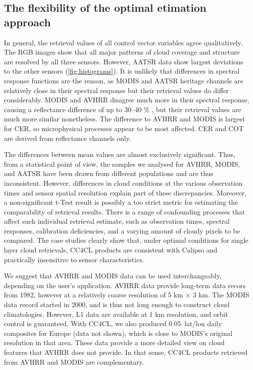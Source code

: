 \label{conclusions}

\subsection{The flexibility of the optimal etimation approach}


In general, the retrieval values of all control vector variables agree qualitatively. The RGB images show that all major patterns of cloud coverage and structure are resolved by all three sensors. However, AATSR data show largest deviations to the other sensors (\cref{fig:histograms}). It is unlikely that differences in spectral response functions are the reason, as MODIS and AATSR heritage channels are relatively close in their spectral response but their retrieval values do differ considerably. MODIS and AVHRR disagree much more in their spectral response, causing a reflectance difference of up to 30--40 \% \citep{Trishchenko02}, but their retrieval values are much more similar nonetheless. The difference to AVHRR and MODIS is largest for CER, so microphysical processes appear to be most affected. CER and COT are derived from reflectance channels only. 

The differences between mean values are almost exclusively significant. Thus, from a statistical point of view, the samples we analysed for AVHRR, MODIS, and AATSR have been drawn from different populations and are thus inconsistent. However, differences in cloud conditions at the various observation times and sensor spatial resolution explain part of these discrepancies. Moreover, a non-significant t-Test result is possibly a too strict metric for estimating the comparability of retrieval results. There is a range of confounding processes that affect each individual retrieval estimate, such as observation times, spectral responses, calibration deficiencies, and a varying amount of cloudy pixels to be compared. The case studies clearly show that, under optimal conditions for single layer cloud retrievals, CC4CL products are consistent with Calipso and practically insensitive to sensor characteristics.

We suggest that AVHRR and MODIS data can be used interchangeably, depending on the user's application. AVHRR data provide long-term data recors from 1982, however at a relatively coarse resolution of 5 km $\times$ 3 km. The MODIS data record started in 2000, and is thus not long enough to construct cloud climatologies. However, L1 data are available at 1 km resolution, and orbit control is guaranteed. With CC4CL, we also produced 0.05\textdegree\ lat/lon daily composites for Europe (data not shown), which is close to MODIS's original resolution in that area. These data provide a more detailed view on cloud features that AVHRR does not provide. In that sense, CC4CL products retrieved from AVHRR and MODIS are complementary.

